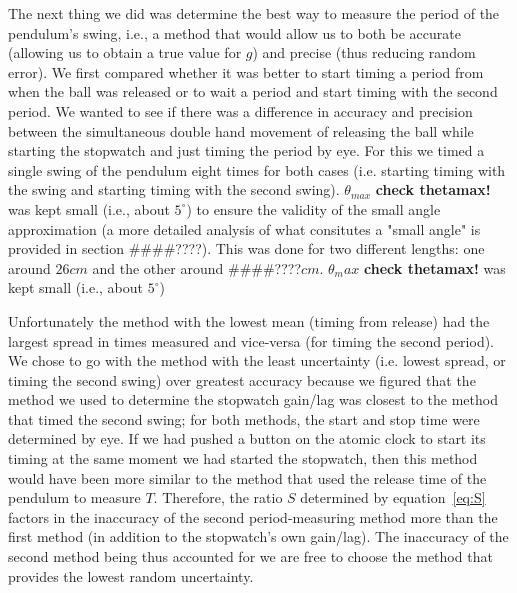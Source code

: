 \documentclass[iop]{emulateapj}
\def\g{$g$}
\def\T{$T$}
\def\fillin{\#\#\#\#????}
\def\deg{^{\circ}}
\begin{document}
The next thing we did was determine the best way to measure the period of the 
pendulum's swing, i.e., a method that would allow us to both be accurate 
(allowing us to obtain a true value for \g) and precise (thus reducing random 
error). We first compared whether it was better to start timing a period from 
when the ball was released or to wait a period and start timing with the 
second period.  We wanted to see if there was a difference in accuracy and 
precision between the simultaneous double hand movement of releasing the ball 
while starting the stopwatch and just timing the period by eye. For this we 
timed a single swing of the pendulum eight times for both cases (i.e. starting 
timing with the swing and starting timing with the second swing). $\theta_{max}$ 
{\bf check thetamax!} was kept small (i.e., about $5\deg$) to ensure the 
validity of the small angle approximation (a more detailed analysis of what 
consitutes a "small angle" is provided in section \fillin). This was done 
for two different lengths: one around $26cm$ and the other around \fillin$cm$. 
$\theta_max$ {\bf check thetamax!} was kept small (i.e., about $5\deg$) 

Unfortunately the method with the lowest 
mean (timing from release) had the largest spread in times measured and 
vice-versa (for timing the second period). We chose to go 
with the method with the least uncertainty (i.e. lowest spread, or timing the 
second swing) over greatest accuracy because we figured that the method we 
used to determine the stopwatch gain/lag was closest to the method that timed 
the second swing; for both methods, the start and stop time were determined by 
eye.  If we had pushed a button on the atomic clock to start its timing at the 
same moment we had started the stopwatch, then this method would have been 
more similar to the method that used the release time of the pendulum to 
measure \T.  Therefore, the ratio $S$ determined by equation~\ref{eq:S} 
factors in the inaccuracy of the second period-measuring method more 
than the first method (in addition to the stopwatch's own gain/lag). The 
inaccuracy of the second method being thus accounted for we are free to choose 
the method that provides the lowest random uncertainty. 
\end{document}
